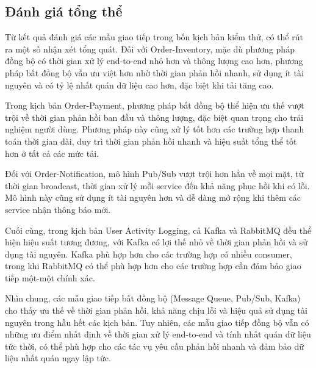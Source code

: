 \subsection{Đánh giá tổng thể}
Từ kết quả đánh giá các mẫu giao tiếp trong bốn kịch bản kiểm thử, có thể rút ra một số nhận xét tổng quát. Đối với Order-Inventory, mặc dù phương pháp đồng bộ có thời gian xử lý end-to-end nhỏ hơn và thông lượng cao hơn, phương pháp bất đồng bộ vẫn ưu việt hơn nhờ thời gian phản hồi nhanh, sử dụng ít tài nguyên và có tỷ lệ nhất quán dữ liệu cao hơn, đặc biệt khi tải tăng cao.

Trong kịch bản Order-Payment, phương pháp bất đồng bộ thể hiện ưu thế vượt trội về thời gian phản hồi ban đầu và thông lượng, đặc biệt quan trọng cho trải nghiệm người dùng. Phương pháp này cũng xử lý tốt hơn các trường hợp thanh toán thời gian dài, duy trì thời gian phản hồi nhanh và hiệu suất tổng thể tốt hơn ở tất cả các mức tải.

Đối với Order-Notification, mô hình Pub/Sub vượt trội hơn hẳn về mọi mặt, từ thời gian broadcast, thời gian xử lý mỗi service đến khả năng phục hồi khi có lỗi. Mô hình này cũng sử dụng ít tài nguyên hơn và dễ dàng mở rộng khi thêm các service nhận thông báo mới.

Cuối cùng, trong kịch bản User Activity Logging, cả Kafka và RabbitMQ đều thể hiện hiệu suất tương đương, với Kafka có lợi thế nhỏ về thời gian phản hồi và sử dụng tài nguyên. Kafka phù hợp hơn cho các trường hợp có nhiều consumer, trong khi RabbitMQ có thể phù hợp hơn cho các trường hợp cần đảm bảo giao tiếp một-một chính xác.

Nhìn chung, các mẫu giao tiếp bất đồng bộ (Message Queue, Pub/Sub, Kafka) cho thấy ưu thế về thời gian phản hồi, khả năng chịu lỗi và hiệu quả sử dụng tài nguyên trong hầu hết các kịch bản. Tuy nhiên, các mẫu giao tiếp đồng bộ vẫn có những ưu điểm nhất định về thời gian xử lý end-to-end và tính nhất quán dữ liệu tức thời, có thể phù hợp cho các tác vụ yêu cầu phản hồi nhanh và đảm bảo dữ liệu nhất quán ngay lập tức.